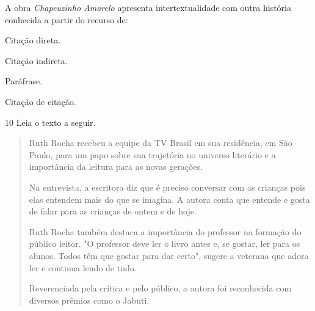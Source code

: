 \noindent A obra \emph{Chapeuzinho Amarelo} apresenta intertextualidade com outra
história conhecida a partir do recurso de:

\begin{escolha}
\item Citação direta.
\item Citação indireta.
\item Paráfrase.
\item Citação de citação.
\end{escolha}




\num{10} Leia o texto a seguir.

\begin{quote}
\noindent Ruth Rocha recebeu a equipe da TV Brasil em sua residência, em São
Paulo, para um papo sobre sua trajetória no universo literário e a
importância da leitura para as novas gerações.

Na entrevista, a escritora diz que é preciso conversar com as crianças
pois elas entendem mais do que se imagina. A autora conta que entende e
gosta de falar para as crianças de ontem e de hoje.

Ruth Rocha também destaca a importância do professor na formação do
público leitor. "O professor deve ler o livro antes e, se gostar, ler
para os alunos. Todos têm que gostar para dar certo", sugere a veterana
que adora ler e continua lendo de tudo.

Reverenciada pela crítica e pelo público, a autora foi reconhecida com
diversos prêmios como o Jabuti.

\end{quote}

